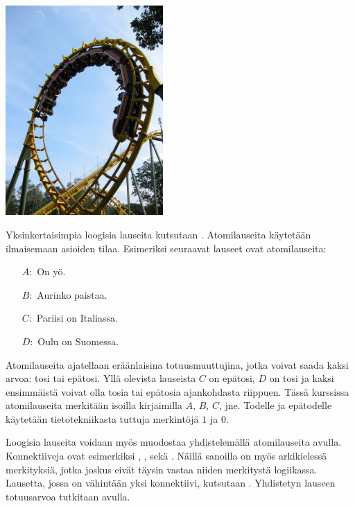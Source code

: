 \bigskip

\begin{center}
\includegraphics[width=6cm]{pictures/kuvitus/Rollercoaster}
\end{center}

\bigskip

Yksinkertaisimpia loogisia lauseita kutsutaan . Atomilauseita käytetään ilmaisemaan asioiden tilaa. Esimeriksi seuraavat lauseet ovat atomilauseita:
\begin{itemize}
\item[$A:$] On yö.
\item[$B:$] Aurinko paistaa.
\item[$C:$] Pariisi on Italiassa.
\item[$D:$] Oulu on Suomessa.
\end{itemize}
Atomilauseita ajatellaan eräänlaisina totuusmuuttujina, jotka voivat saada kaksi arvoa: tosi tai epätosi. Yllä olevista lauseista $C$ on epätosi, $D$ on tosi ja kaksi ensimmäistä voivat olla tosia tai epätosia ajankohdasta riippuen. Tässä kurssissa atomilauseita merkitään isoilla kirjaimilla $A$, $B$, $C$, jne. Todelle ja epätodelle käytetään tietotekniikasta tuttuja merkintöjä $1$ ja $0$.

Loogisia lauseita voidaan myös muodostaa yhdistelemällä atomilauseita  avulla. Konnektiiveja ovat esimerkiksi , ,  sekä . Näillä sanoilla on myös arkikielessä merkityksiä, jotka joskus eivät täysin vastaa niiden merkitystä logiikassa. Lausetta, jossa on vähintään yksi konnektiivi, kutsutaan . Yhdistetyn lauseen totuusarvoa tutkitaan  avulla.

